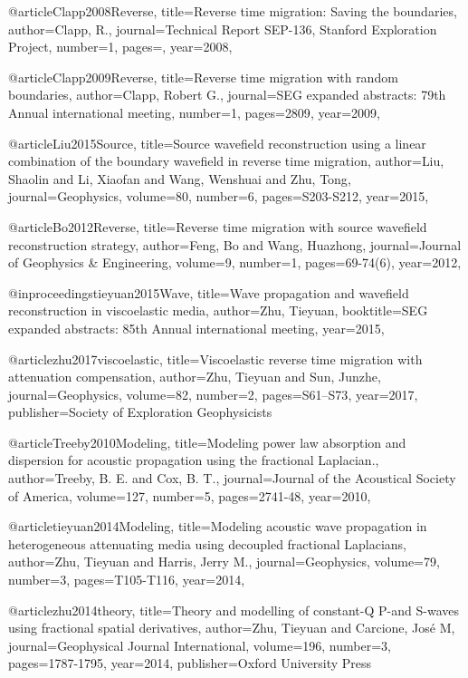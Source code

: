 {@article{Clapp2008Reverse,
  title={Reverse time migration: Saving the boundaries},
  author={Clapp, R.},
  journal={Technical Report SEP-136, Stanford Exploration Project},
  number={1},
  pages={},
  year={2008},
}

@article{Clapp2009Reverse,
  title={Reverse time migration with random boundaries},
  author={Clapp, Robert G.},
  journal={SEG expanded abstracts: 79th Annual international meeting},
  number={1},
  pages={2809},
  year={2009},
}

@article{Liu2015Source,
  title={Source wavefield reconstruction using a linear combination of the boundary wavefield in reverse time migration},
  author={Liu, Shaolin and Li, Xiaofan and Wang, Wenshuai and Zhu, Tong},
  journal={Geophysics},
  volume={80},
  number={6},
  pages={S203-S212},
  year={2015},
}

@article{Bo2012Reverse,
  title={Reverse time migration with source wavefield reconstruction strategy},
  author={Feng, Bo and Wang, Huazhong},
  journal={Journal of Geophysics \& Engineering},
  volume={9},
  number={1},
  pages={69-74(6)},
  year={2012},
}

@inproceedings{tieyuan2015Wave,
  title={Wave propagation and wavefield reconstruction in viscoelastic media},
  author={Zhu, Tieyuan},
  booktitle={SEG expanded abstracts: 85th Annual international meeting},
  year={2015},
}

@article{zhu2017viscoelastic,
  title={Viscoelastic reverse time migration with attenuation compensation},
  author={Zhu, Tieyuan and Sun, Junzhe},
  journal={Geophysics},
  volume={82},
  number={2},
  pages={S61--S73},
  year={2017},
  publisher={Society of Exploration Geophysicists}
}


@article{Treeby2010Modeling,
  title={Modeling power law absorption and dispersion for acoustic propagation using the fractional Laplacian.},
  author={Treeby, B. E. and Cox, B. T.},
  journal={Journal of the Acoustical Society of America},
  volume={127},
  number={5},
  pages={2741-48},
  year={2010},
}

@article{tieyuan2014Modeling,
  title={Modeling acoustic wave propagation in heterogeneous attenuating media using decoupled fractional Laplacians},
  author={Zhu, Tieyuan and Harris, Jerry M.},
  journal={Geophysics},
  volume={79},
  number={3},
  pages={T105-T116},
  year={2014},
}

@article{zhu2014theory,
  title={Theory and modelling of constant-{Q} {P}-and {S}-waves using fractional spatial derivatives},
  author={Zhu, Tieyuan and Carcione, Jos{\'e} M},
  journal={Geophysical Journal International},
  volume={196},
  number={3},
  pages={1787-1795},
  year={2014},
  publisher={Oxford University Press}
}


}
